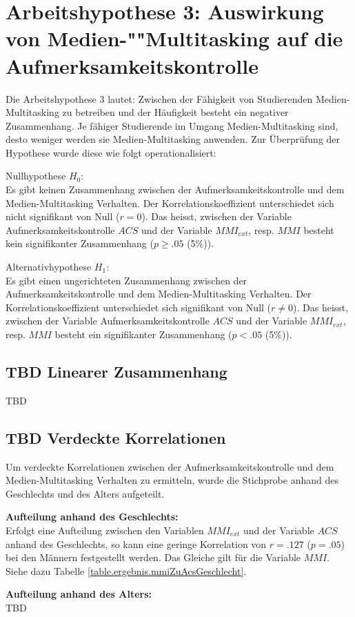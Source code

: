 \section{Arbeitshypothese 3: Auswirkung von Medien-""Multitasking auf die Aufmerksamkeitskontrolle}\label{label.ergebnisse.arbeitshypothese3}
Die Arbeitshypothese 3 lautet: Zwischen der Fähigkeit von Studierenden Medien-Multitasking zu betreiben und der Häufigkeit besteht ein negativer Zusammenhang. Je fähiger Studierende im Umgang Medien-Multitasking sind, desto weniger werden sie Medien-Multitasking anwenden. Zur Überprüfung der Hypothese wurde diese wie folgt operationalisiert:\par
Nullhypothese $H_{0}$:\\
Es gibt keinen Zusammenhang zwischen der Aufmerksamkeitskontrolle und dem Medien-Multitasking Verhalten. Der Korrelationskoeffizient unterschiedet sich nicht signifikant von Null ($r=0$). Das heisst, zwischen der Variable Aufmerksamkeitskontrolle $ACS$ und der Variable $MMI_{ext}$, resp. $MMI$ besteht kein signifikanter Zusammenhang ($p \geq .05$ (5\%)).
\par
Alternativhypothese $H_{1}$:\\
Es gibt einen ungerichteten Zusammenhang zwischen der Aufmerksamkeitskontrolle und dem Medien-Multitasking Verhalten. Der Korrelationskoeffizient unterschiedet sich signifikant von Null ($r \neq 0$). Das heisst, zwischen der Variable Aufmerksamkeitskontrolle $ACS$ und der Variable $MMI_{ext}$, resp. $MMI$ besteht ein signifikanter Zusammenhang ($p < .05$ (5\%)).
\subsection{TBD Linearer Zusammenhang}
TBD
\subsection{TBD Verdeckte Korrelationen}
Um verdeckte Korrelationen zwischen der Aufmerksamkeitskontrolle und dem Medien-Multitasking Verhalten zu ermitteln, wurde die Stichprobe anhand des Geschlechts und des Alters aufgeteilt.
\par
\textbf{Aufteilung anhand des Geschlechts:}\\
Erfolgt eine Aufteilung zwischen den Variablen $MMI_{ext}$ und der Variable $ACS$ anhand des Geschlechts, so kann eine geringe Korrelation von $r=.127$ ($p=.05$) bei den Männern festgestellt werden. Das Gleiche gilt für die Variable $MMI$. Siehe dazu Tabelle \ref{table.ergebnis.mmiZuAcsGeschlecht}.
\par
\textbf{Aufteilung anhand des Alters:}\\
TBD
